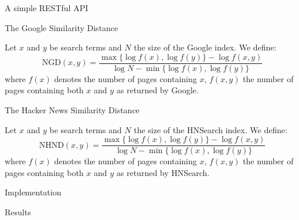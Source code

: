 \documentclass[12pt]{beamer}
\begin{document}
    \begin{frame}{A simple RESTful API}
    \end{frame}

    \begin{frame}{The Google Similarity Distance}
        \begin{definition}
            Let \(x\) and \(y\) be search terms and \(N\) the size of the Google index. We define:
            \[
                \text{NGD}(x,y) = \frac{\max{\{\log{f(x)}, \log{f(y)}\}} - \log{f(x,y)}}{\log{N} - \min{\{\log{f(x)}, \log{f(y)}\}}}
            \]
            where \(f(x)\) denotes the number of pages containing \(x\), \(f(x,y)\) the number of pages containing both \(x\) and \(y\) as returned by Google.
        \end{definition}
    \end{frame}

    \begin{frame}{The Hacker News Similarity Distance}
        \begin{definition}
            Let \(x\) and \(y\) be search terms and \(N\) the size of the HNSearch index. We define:
            \[
                \text{NHND}(x,y) = \frac{\max{\{\log{f(x)}, \log{f(y)}\}} - \log{f(x,y)}}{\log{N} - \min{\{\log{f(x)}, \log{f(y)}\}}}
            \]
            where \(f(x)\) denotes the number of pages containing \(x\), \(f(x,y)\) the number of pages containing both \(x\) and \(y\) as returned by HNSearch.
        \end{definition}
    \end{frame}

    \begin{frame}{Implementation}
    \end{frame}

    \begin{frame}{Results}
    \end{frame}
\end{document}
